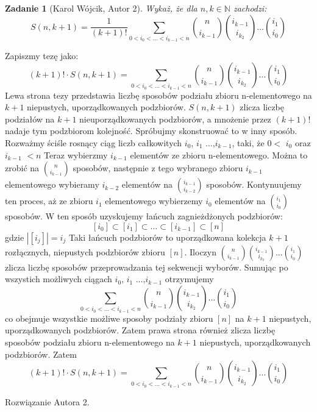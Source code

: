 \documentclass{mwart}
\newtheorem{zad}{Zadanie}[section]
\begin{document}
\begin{zad}[Karol Wójcik, Autor 2]
    Wykaż, że dla $n, k \in \mathbb{N}$ zachodzi:
    \[S(n,k+1)=\frac{1}{(k+1)!} \sum_{0<i_0<...<i_{k-1}<n} \binom{n}{i_{k-1}}\binom{i_{k-1}}{i_{k_2}}...\binom{i_1}{i_0}     \]
\end{zad}
\begin{mdframed}
    Zapiszmy tezę jako:
    \[(k+1)! \cdot S(n,k+1) = \sum_{0<i_0<...<i_{k-1}<n} \binom{n}{i_{k-1}}\binom{i_{k-1}}{i_{k_2}}...\binom{i_1}{i_0} \]
    \newline \newline
    Lewa strona tezy przedstawia liczbę sposobów podziału zbioru n-elementowego na $k+1$ niepustych,
    uporządkowanych podzbiorów. $S(n,k+1)$ zlicza liczbę podziałów na $k+1$ nieuporządkowanych podzbiorów,
    a mnożenie przez $(k+1)!$ nadaje tym podzbiorom kolejność.
    \newline \newline
    Spróbujmy skonstruować to w inny sposób. Rozważmy ściśle rosnący ciąg liczb całkowitych $i_0$, $i_1$ $\dots$,$i_{k-1}$,
    taki, że $0<$ $i_0$ oraz $i_{k-1}$ $<n$
    Teraz wybierzmy $i_{k-1}$ elementów ze zbioru n-elementowego. Można to zrobić na $\binom{n}{i_{k-1}}$ sposobów,
    następnie z tego wybranego zbioru $i_{k-1}$ elementowego wybieramy $i_{k-2}$ elementów na $\binom{i_{k-1}}{i_{k-2}}$ sposobów.
    Kontynuujemy ten proces, aż ze zbioru $i_1$ elementowego wybierzemy $i_0$ elementów na $\binom{i_1}{i_0}$ sposobów.
    W ten sposób uzyskujemy łańcuch zagnieżdżonych podzbiorów:
    \newline
    \[[i_0]\subset [i_1]\subset \dots \subset [i_{k-1}] \subset [n] \]
    \newline
    gdzie $|[i_j]| = i_j$
    \newline
    Taki łańcuch podzbiorów to uporządkowana kolekcja $k+1$ rozłącznych, niepustych podzbiorów zbioru $[n]$.
    Iloczyn $\binom{n}{i_{k-1}}\binom{i_{k-1}}{i_{k_2}}...\binom{i_1}{i_0}$ zlicza liczbę sposobów przeprowadzania tej sekwencji wyborów.
    Sumując po wszystich możliwych ciągach $i_0$, $i_1$ $\dots$,$i_{k-1}$ otrzymujemy 
    \newline
    \[\sum_{0<i_0<...<i_{k-1}<n} \binom{n}{i_{k-1}}\binom{i_{k-1}}{i_{k_2}}...\binom{i_1}{i_0} \]
    \newline
    co obejmuje wszystkie możliwe sposoby podziały zbioru $[n]$ na $k+1$ niepustych, uporządkowanych podzbiorów.
    \newline
    Zatem prawa strona również zlicza liczbę sposobów podziału zbioru n-elementowego na $k+1$ niepustych, uporządkowanych podzbiorów.
    \newline
    Zatem
    \newline 
    \[(k+1)! \cdot S(n,k+1) = \sum_{0<i_0<...<i_{k-1}<n} \binom{n}{i_{k-1}}\binom{i_{k-1}}{i_{k_2}}...\binom{i_1}{i_0} \]
\end{mdframed}
\begin{mdframed}
    Rozwiązanie Autora 2.
\end{mdframed}
\end{document}

